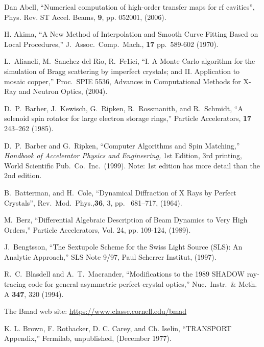\begin{thebibliography}{XXXXXXX99}

Dan Abell, ``Numerical computation of high-order transfer maps for rf cavities'',
Phys. Rev. ST Accel. Beams, {\bf 9}, pp. 052001, (2006).

H. Akima, 
``A New Method of Interpolation and Smooth Curve Fitting Based on Local Procedures,'' 
J.\ Assoc.\ Comp.\ Mach., {\bf 17} pp.~589-602 (1970).

L.~Alianeli, M.~Sanchez del Rio, R.~Fe1ici,
``I. A Monte Carlo algorithm for the simulation of Bragg scattering by imperfect crystals; 
and II. Application to mosaic copper,''
Proc.~SPIE 5536, Advances in Computational Methods for X-Ray and Neutron Optics, (2004).

D.\ P.\ Barber, J.\ Kewisch, G.\ Ripken, R.\ Rossmanith, and R.\ Schmidt,
``A solenoid spin rotator for large electron storage rings,''
Particle Accelerators, {\bf 17} 243–262 (1985).

D.~P.~Barber and G.~Ripken,
``Computer Algorithms and Spin Matching,''
{\it Handbook of Accelerator Physics and Engineering,}
1st Edition, 3rd printing, World Scientific Pub.\ Co.\ Inc.\ (1999).
Note: 1st edition has more detail than the 2nd edition.

B.~Batterman, and H.~Cole,
``Dynamical Diffraction of X Rays by Perfect Crystals'',
Rev.\ Mod.\ Phys.,{\bf 36}, 3, pp.~ 681--717, (1964).

M.~Berz, 
``Differential Algebraic Description of Beam Dynamics to Very High Orders,''
Particle Accelerators, Vol. 24, pp. 109-124, (1989).

J.~Bengtsson,
``The Sextupole Scheme for the Swiss Light Source (SLS): An Analytic Approach,''
SLS Note 9/97, Paul Scherrer Institut, (1997).

R.~C.~Blasdell and A.~T.~Macrander, 
``Modifications to the 1989 SHADOW ray-tracing code for general asymmetric perfect-crystal optics,''
Nuc.\ Instr.\ \& Meth. A {\bf 347}, 320 (1994).

The Bmad web site:
\hfill\break
\hspace*{0.3in} \url{https://www.classe.cornell.edu/bmad}

K. L. Brown, F. Rothacker, D. C. Carey, and Ch. Iselin, 
``TRANSPORT Appendix,'' 
Fermilab, unpublished, (December 1977).


\end{thebibliography}

